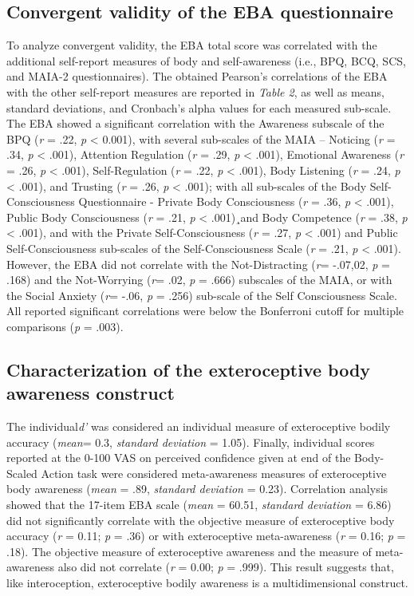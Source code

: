 \documentclass[man]{apa7}
\begin{document}
\subsection{Convergent validity of the EBA questionnaire}
To analyze convergent validity, the EBA total score was correlated with the additional self-report measures of body and self-awareness (i.e., BPQ, BCQ, SCS, and MAIA-2 questionnaires). The obtained Pearson’s correlations of the EBA with the other self-report measures are reported in \emph{Table 2}, as well as means, standard deviations, and Cronbach’s alpha values for each measured sub-scale. The EBA showed a significant correlation with the Awareness subscale of the BPQ (\emph{r} = .22, \emph{p} < 0.001), with  several sub-scales of the MAIA – Noticing (\emph{r} = .34, \emph{p} < .001), Attention Regulation (\emph{r} = .29, \emph{p} < .001), Emotional Awareness (\emph{r} = .26, \emph{p} < .001), Self-Regulation (\emph{r} = .22, \emph{p} < .001), Body Listening (\emph{r} = .24, \emph{p} < .001), and Trusting (\emph{r} = .26, \emph{p} < .001); with all sub-scales of the Body Self-Consciousness Questionnaire - Private Body Consciousness (\emph{r} = .36, \emph{p} < .001), Public Body Consciousness (\emph{r} = .21, \emph{p} < .001)¸and Body Competence (\emph{r} = .38, \emph{p} < .001), and with the Private Self-Consciousness (\emph{r} = .27, \emph{p} < .001) and Public Self-Consciousness sub-scales of the Self-Consciousness Scale  (\emph{r} = .21, \emph{p} < .001). However, the EBA did not correlate with the Not-Distracting (\emph{r}= -.07,02, \emph{p} = .168) and the Not-Worrying (\emph{r}= .02, \emph{p} = .666) subscales of the MAIA, or with the Social Anxiety (\emph{r}= -.06, \emph{p} = .256) sub-scale of the Self Consciousness Scale. All reported significant correlations were below the Bonferroni cutoff for multiple comparisons (\emph{p} = .003).
\subsection{Characterization of the exteroceptive body awareness construct }
The individual\emph{d’} was considered an individual measure of exteroceptive bodily accuracy (\emph{mean}= 0.3, \emph{standard deviation} = 1.05). Finally, individual scores reported at the 0-100 VAS on perceived confidence given at end of the Body-Scaled Action task were considered meta-awareness measures of exteroceptive body awareness (\emph{mean} = .89, \emph{standard deviation} = 0.23). Correlation analysis showed that the 17-item EBA scale (\emph{mean} = 60.51, \emph{standard deviation} = 6.86) did not significantly correlate with the objective measure of exteroceptive body accuracy (\emph{r} = 0.11; \emph{p} = .36) or with exteroceptive meta-awareness (\emph{r} = 0.16; \emph{p} = .18). The objective measure of exteroceptive awareness and the measure of meta-awareness also did not correlate (\emph{r} = 0.00; \emph{p} = .999). This result suggests that, like interoception, exteroceptive bodily awareness is a multidimensional construct. 
\end{document}
